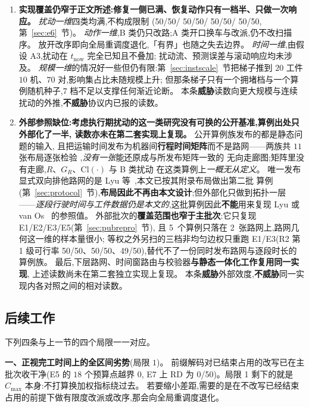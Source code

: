 \documentclass[manuscript,screen,review]{acmart}
\newcommand{\NPairs}{50}
\newcommand{\RzeroPastLo}{0}
\newcommand{\NPubInst}{5}
\newcommand{\NPubNets}{2}
\newcommand{\RedecodeBad}{0/\NPairs}
\newcommand{\ScaleKs}{7}
\newcommand{\ScalePairs}{70}
\newcommand{\ScaleJobsHi}{20}
\newcommand{\ScaleMachHi}{10}
\newcommand{\FeasESixBlock}{\NPairs/\NPairs}
\newcommand{\FeasSlow}{\NPairs/\NPairs}
\newcommand{\FeasESixAgv}{\NPairs/\NPairs}
\newcommand{\FeasESixRa}{\NPairs/\NPairs}
\newcommand{\WeightLogRtwo}{\NPairs/\NPairs}
\newcommand{\WeightLuRtwo}{\NPairs/\NPairs}
\newcommand{\WeightSplitRtwo}{49/\NPairs}
\begin{document}
\begin{enumerate}[leftmargin=1.6em,itemsep=0.35em]
\item \textbf{实现覆盖仍窄于正文所述:修复一侧已满、恢复动作只有一档半、只做一次响应。}
\emph{扰动一维}四类均满,不构成限制
(\FeasESixBlock / \FeasSlow / \FeasESixAgv / \FeasESixRa,第~\ref{sec:e6}~节)。
\emph{动作一维},B 类仍只改路;A 类开口换车与改派,仍不改扫描序。
放开改序即向全局重调度退化,「有界」也随之失去边界。
\emph{时间一维},由假设 A3,扰动在 \(t_{\mathrm{now}}\) 完全已知且不叠加;
扰动流、预测误差与滚动响应均未涉及。
\emph{规模一维}的情况好一些但仍有限:第~\ref{sec:instscale}~节把梯子推到
\(\ScaleJobsHi\) 工件 \(\ScaleMachHi\) 机、\(\ScalePairs\) 对,影响集占比未随规模上升;
但那条梯子只有一个拥堵档与一个算例随机种子,\(\ScaleKs\) 档不足以支撑任何渐近论断。
本条\textbf{威胁}读数向更大规模与连续扰动的外推,\textbf{不威胁}协议内已报的读数。

\item \textbf{外部参照缺位:考虑执行期扰动的这一类研究没有可换的公开基准,算例出处只外部化了一半,
读数亦未在第二套实现上复现。}
公开算例族发布的都是静态问题的输入,
且把运输时间发布为机器间\textbf{行程时间矩阵}而不是路网——两族共 \(11\) 张布局逐张检验
\cite{homayouni2021production,bilge1995time},\emph{没有一张}能还原成与所发布矩阵一致的
无向走廊图;矩阵里没有走廊,\(R\)、\(G_R\)、\(\mathrm{Cl}(\cdot)\) 与 B 类扰动
在这类算例上\emph{一概无从定义}。
唯一发布显式双向排他路网的是 Lyu 等~\cite{lyu2019approach},本文已按其附录布局做出第二批
算例(第~\ref{sec:protocol}~节),\textbf{布局因此不再由本文设计};但外部化只做到拓扑一层
——\emph{逐段行驶时间与工件数据仍是本文的},这批算例因此\textbf{不能}用来复现
Lyu 或 van Os~\cite{vanos2026exact} 的参照值。
外部批次的\textbf{覆盖范围也窄于主批次}:它只复现 E1/E2/E3/E5(第~\ref{sec:pubrepro}~节),
且 \NPubInst\ 个算例只落在 \NPubNets\ 张路网上,路网几何这一维的样本量很小;
等权之外另扫的三档非均匀边权只重跑 E1/E3(R2 第 1 级可行率
\WeightLogRtwo、\WeightLuRtwo、\WeightSplitRtwo),替代不了一份同时发布路网与逐段时长的算例族。
最后,下层路网、时间窗路由与校验器\textbf{与静态一体化工作复用同一实现},
上述读数尚未在第二套独立实现上复现。
本条\textbf{威胁}外部效度,\textbf{不威胁}同一实现内各对照之间的相对读数。
\end{enumerate}

\subsection{后续工作}
\label{sec:future}

下列四条与上一节的四个局限一一对应。

\textbf{一、正视完工时间上的全区间劣势}(局限 \(1\))。
前缀解码对已结束占用的改写已在主批次收干净(E5 的 \(18\) 个预算点越界 \(\RzeroPastLo\),
E7 上 RD 为 \RedecodeBad)。局限 1 剩下的就是 \(C_{\max}\) 本身:不打算换加权指标绕过去。
若要缩小差距,需要的是在不改写已经结束占用的前提下做有限度改派或改序,那会向全局重调度退化。
\end{document}
